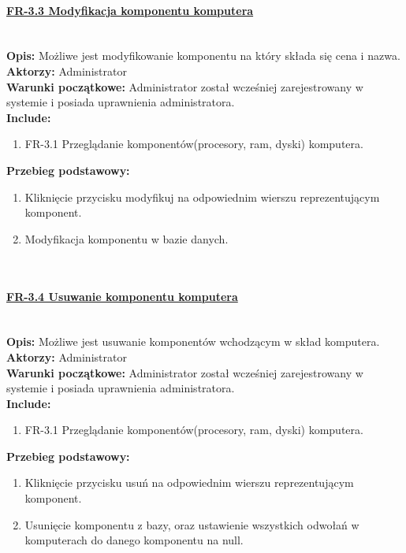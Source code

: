 \paragraph{\underline{FR-3.3 Modyfikacja komponentu komputera}}\mbox{}\\[1mm]
	\noindent\textbf{Opis:} Możliwe jest modyfikowanie komponentu na który składa się cena i nazwa.\\
	\noindent\textbf{Aktorzy:} Administrator\\
	\textbf{Warunki początkowe:} Administrator został wcześniej zarejestrowany w systemie i posiada uprawnienia administratora.\\
	\textbf{Include:} 
	\begin{enumerate}[noparskip]
		\item FR-3.1 Przeglądanie komponentów(procesory, ram, dyski) komputera.
	\end{enumerate}
  \textbf{Przebieg podstawowy:}
	\begin{enumerate}[noparskip]
		\item Kliknięcie przycisku modyfikuj na odpowiednim wierszu reprezentującym komponent.
		\item Modyfikacja komponentu w bazie danych.
  \end{enumerate} \mbox{}\\[-11mm]

\paragraph{\underline{FR-3.4 Usuwanie komponentu komputera}}\mbox{}\\[1mm]
	\noindent\textbf{Opis:} Możliwe jest usuwanie komponentów wchodzącym w skład komputera.\\
	\noindent\textbf{Aktorzy:} Administrator\\
	\textbf{Warunki początkowe:} Administrator został wcześniej zarejestrowany w systemie i posiada uprawnienia administratora.\\
	\textbf{Include:} 
	\begin{enumerate}[noparskip]
		\item FR-3.1 Przeglądanie komponentów(procesory, ram, dyski) komputera.
	\end{enumerate}
    \textbf{Przebieg podstawowy:}
	\begin{enumerate}[noparskip]
		\item Kliknięcie przycisku usuń na odpowiednim wierszu reprezentującym komponent.
		\item Usunięcie komponentu z bazy, oraz ustawienie wszystkich odwołań w komputerach do danego komponentu na null.
  \end{enumerate} \mbox{}\\[-11mm]

